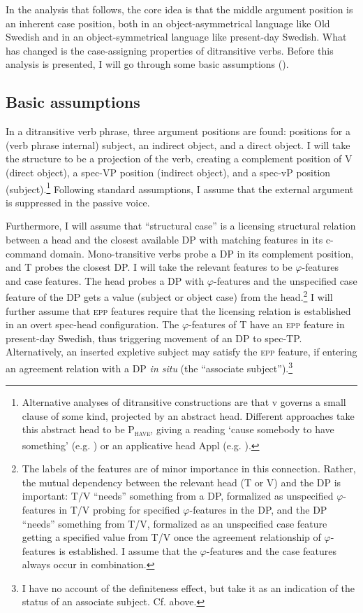 \documentclass[output=paper]{langscibook}
\begin{document}
In the analysis that follows, the core idea is that the middle argument position is an inherent case position, both in an object-asymmetrical language like Old Swedish and in an object-symmetrical language like present-day Swedish. What has changed is the case-assigning properties of ditransitive verbs. Before this analysis is presented, I will go through some basic assumptions ().

\subsection{Basic assumptions}\label{sec:falk:4.1}


In a ditransitive verb phrase, three argument positions are found: positions for a (verb phrase internal) subject, an indirect object, and a direct object. I will take the structure to be a projection of the verb, creating a complement position of V (direct object), a spec-VP position (indirect object), and a spec-vP position (subject).\footnote{Alternative analyses of ditransitive constructions are that v governs a small clause of some kind, projected by an abstract head. Different approaches take this abstract head to be P\textsc{\textsubscript{have}}, giving a reading ‘cause somebody to have something’ (e.g. \citealt{HarleyJung2015}) or an applicative head Appl (e.g. \citealt{Pylkkanen2008}).} Following standard assumptions, I assume that the external argument is suppressed in the passive voice.


Furthermore, I will assume that “structural case” is a licensing structural relation between a head and the closest available DP with matching features in its c-command domain. Mono-transitive verbs probe a DP in its complement position, and T probes the closest DP. I will take the relevant features to be $\varphi $-features and case features. The head probes a DP with $\varphi $-features and the unspecified case feature of the DP gets a value (subject or object case) from the head.\footnote{The labels of the features are of minor importance in this connection. Rather, the mutual dependency between the relevant head (T or V) and the DP is important: T/V “needs” something from a DP, formalized as unspecified $\varphi ${}-features in T/V probing for specified $\varphi ${}-features in the DP, and the DP “needs” something from T/V, formalized as an unspecified case feature getting a specified value from T/V once the agreement relationship of $\varphi ${}-features is established. I assume that the $\varphi ${}-features and the case features always occur in combination.} I will further assume that \textsc{epp} features require that the licensing relation is established in an overt spec-head configuration. The $\varphi $-features of T have an \textsc{epp} feature in present-day Swedish, thus triggering movement of an DP to spec-TP. Alternatively, an inserted expletive subject may satisfy the \textsc{epp} feature, if entering an agreement relation with a DP \textit{in situ} (the “associate subject”).\footnote{I have no account of the definiteness effect, but take it as an indication of the status of an associate subject. Cf.  above.}
\end{document}
